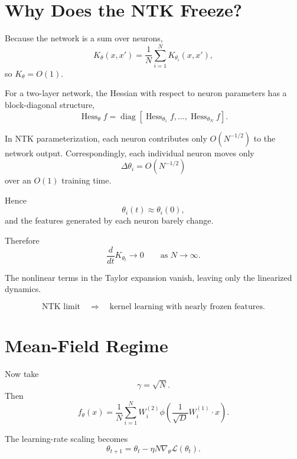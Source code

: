 \section{Why Does the NTK Freeze?}

Because the network is a sum over neurons,
\begin{equation}
    K_\theta(x,x')
    =
    \frac{1}{N}
    \sum_{i=1}^{N}
    K_{\theta_i}(x,x'),
\end{equation}
so \(K_\theta=O(1)\).

For a two-layer network, the Hessian with respect to neuron parameters
has a block-diagonal structure,
\begin{equation}
    \operatorname{Hess}_\theta f
    =
    \operatorname{diag}
    \left[
        \operatorname{Hess}_{\theta_1}f,
        \ldots,
        \operatorname{Hess}_{\theta_N}f
    \right].
\end{equation}

In NTK parameterization, each neuron contributes only
\(O(N^{-1/2})\) to the network output. Correspondingly, each individual
neuron moves only
\[
\Delta\theta_i
=
O(N^{-1/2})
\]
over an \(O(1)\) training time.

Hence
\[
\theta_i(t)
\approx
\theta_i(0),
\]
and the features generated by each neuron barely change.

Therefore
\begin{equation}
    \boxed{
    \frac{d}{dt}K_{\theta_t}
    \longrightarrow 0
    \qquad
    \text{as }
    N\rightarrow\infty.
    }
\end{equation}

The nonlinear terms in the Taylor expansion vanish, leaving only the
linearized dynamics.

\[
\boxed{
\text{NTK limit}
\quad\Longrightarrow\quad
\text{kernel learning with nearly frozen features}.
}
\]

\section{Mean-Field Regime}

Now take
\[
\gamma=\sqrt{N}.
\]
Then
\begin{equation}
    \boxed{
    f_\theta(x)
    =
    \frac{1}{N}
    \sum_{i=1}^{N}
    W_i^{(2)}
    \phi\!\left(
        \frac{1}{\sqrt{D}}
        W_i^{(1)}\cdot x
    \right).
    }
\end{equation}

The learning-rate scaling becomes
\begin{equation}
    \boxed{
    \theta_{t+1}
    =
    \theta_t
    -
    \eta N
    \nabla_\theta
    \mathcal{L}(\theta_t).
    }
\end{equation}

